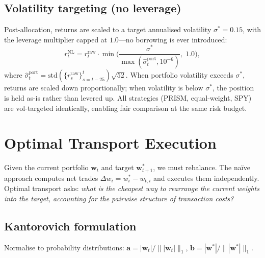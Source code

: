 \documentclass[10pt,twocolumn]{article}
\newcommand{\bw}{\bm{w}}
\begin{document}
\subsection{Volatility targeting (no leverage)}

Post-allocation, returns are scaled to a target annualised volatility
$\sigma^*=0.15$, with the leverage multiplier capped at $1.0$---no
borrowing is ever introduced:
\begin{equation}\label{eq:vt}
r_t^{\mathrm{NL}} = r_t^{\mathrm{raw}}\cdot
  \min\!\Big(\frac{\sigma^*}
  {\max(\hat\sigma_t^{\mathrm{port}},10^{-6})},\;1.0\Big),
\end{equation}
where $\hat\sigma_t^{\mathrm{port}}=
\mathrm{std}(\{r_s^{\mathrm{raw}}\}_{s=t-25}^{t})\sqrt{52}$.
When portfolio volatility exceeds $\sigma^*$, returns are scaled
down proportionally; when volatility is below $\sigma^*$, the
position is held as-is rather than levered up.  All strategies
(PRISM, equal-weight, SPY) are vol-targeted identically, enabling
fair comparison at the same risk budget.

\FloatBarrier
\section{Optimal Transport Execution}\label{sec:ot}

Given the current portfolio $\bw_t$ and target $\bw^*_{t+1}$, we
must rebalance.  The na\"ive approach computes net trades
$\Delta w_i=w_i^*-w_{t,i}$ and executes them independently.
Optimal transport asks: \emph{what is the cheapest way to rearrange
the current weights into the target, accounting for the pairwise
structure of transaction costs?}

\subsection{Kantorovich formulation}

Normalise to probability distributions:
$\bm{a}=|\bw_t|/\||\bw_t|\|_1$,
$\bm{b}=|\bw^*|/\||\bw^*|\|_1$.
\end{document}

